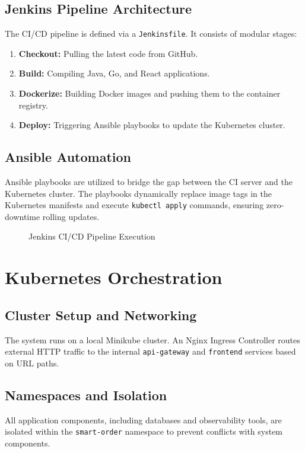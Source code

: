 \documentclass[12pt,a4paper]{report}
\begin{document}
\section{Jenkins Pipeline Architecture}
The CI/CD pipeline is defined via a \texttt{Jenkinsfile}. It consists of modular stages:
\begin{enumerate}
    \item \textbf{Checkout:} Pulling the latest code from GitHub.
    \item \textbf{Build:} Compiling Java, Go, and React applications.
    \item \textbf{Dockerize:} Building Docker images and pushing them to the container registry.
    \item \textbf{Deploy:} Triggering Ansible playbooks to update the Kubernetes cluster.
\end{enumerate}

\section{Ansible Automation}
Ansible playbooks are utilized to bridge the gap between the CI server and the Kubernetes cluster. The playbooks dynamically replace image tags in the Kubernetes manifests and execute \texttt{kubectl apply} commands, ensuring zero-downtime rolling updates.

\begin{figure}[H]
    \centering
    \caption{Jenkins CI/CD Pipeline Execution}
\end{figure}

\chapter{Kubernetes Orchestration}

\section{Cluster Setup and Networking}
The system runs on a local Minikube cluster. An Nginx Ingress Controller routes external HTTP traffic to the internal \texttt{api-gateway} and \texttt{frontend} services based on URL paths.

\section{Namespaces and Isolation}
All application components, including databases and observability tools, are isolated within the \texttt{smart-order} namespace to prevent conflicts with system components.
\end{document}
